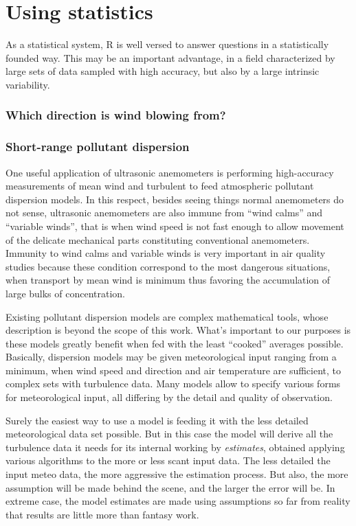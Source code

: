 \documentclass[a4paper,10pt]{book}
\begin{document}
\section{Using statistics}

As a statistical system, R is well versed to answer questions in a statistically founded way. This may be an important advantage, in a field characterized by large sets of data sampled with high accuracy, but also by a large intrinsic variability.


\subsubsection{Which direction is wind blowing from?}


\subsubsection{Short-range pollutant dispersion}

One useful application of ultrasonic anemometers is performing high-accuracy measurements of mean wind and turbulent to feed atmospheric pollutant dispersion models. In this respect, besides seeing things normal anemometers do not sense, ultrasonic anemometers are also immune from ``wind calms'' and ``variable winds'', that is when wind speed is not fast enough to allow movement of the delicate mechanical parts constituting conventional anemometers. Immunity to wind calms and variable winds is very important in air quality studies because these condition correspond to the most dangerous situations, when transport by mean wind is minimum thus favoring the accumulation of large bulks of concentration.

Existing pollutant dispersion models are complex mathematical tools, whose description is beyond the scope of this work. What's important to our purposes is these models greatly benefit when fed with the least ``cooked'' averages possible. Basically, dispersion models may be given meteorological input ranging from a minimum, when wind speed and direction and air temperature are sufficient, to complex sets with turbulence data. Many models allow to specify various forms for meteorological input, all differing by the detail and quality of observation.

Surely the easiest way to use a model is feeding it with the less detailed meteorological data set possible. But in this case the model will derive all the turbulence data it needs for its internal working by \emph{estimates}, obtained applying various algorithms to the more or less scant input data. The less detailed the input meteo data, the more aggressive the estimation process. But also, the more assumption will be made behind the scene, and the larger the error will be. In extreme case, the model estimates are made using assumptions so far from reality that results are little more than fantasy work.
\end{document}
